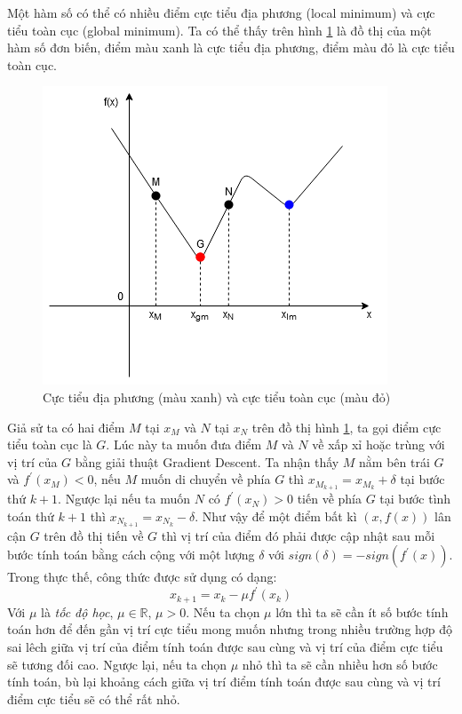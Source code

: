 Một hàm số có thể có nhiều điểm cực tiểu địa phương (local minimum) và cực tiểu toàn cục (global minimum). Ta có thể thấy trên hình \ref{fig:minimums} là đồ thị của một hàm số đơn biến, điểm màu xanh là cực tiểu địa phương, điểm màu đỏ là cực tiểu toàn cục.
\begin{figure}[ht!]
	\centerline{\includegraphics[scale=0.8]{images/minimums.png}}
  	\caption{Cực tiểu địa phương (màu xanh) và cực tiểu toàn cục (màu đỏ)}
  	\label{fig:minimums}
\end{figure}
Giả sử ta có hai điểm $M$ tại $x_M$ và $N$ tại $x_N$ trên đồ thị hình \ref{fig:minimums}, ta gọi điểm cực tiểu toàn cục là $G$. Lúc này ta muốn đưa điểm $M$ và $N$ về xấp xỉ hoặc trùng với vị trí của $G$ bằng giải thuật Gradient Descent. Ta nhận thấy $M$ nằm bên trái $G$ và $f^{'}(x_{M})<0$, nếu $M$ muốn di chuyển về phía $G$ thì $x_{M_{k+1}}=x_{M_{k}}+\delta$ tại bước thứ $k+1$. Ngược lại nếu ta muốn $N$ có $f^{'}(x_{N})>0$ tiến về phía $G$ tại bước tình toán thứ $k+1$ thì $x_{N_{k+1}}=x_{N_{k}}-\delta$. Như vậy để một điểm bất kì $(x,f(x))$ lân cận $G$ trên đồ thị tiến về $G$ thì vị trí của điểm đó phải được cập nhật sau mỗi bước tính toán bằng cách cộng với một lượng $\delta$ với $sign(\delta)=-sign(f^{'}(x))$. Trong thực thế, công thức được sử dụng có dạng:
\begin{equation}
	x_{k+1}=x_{k}-{\mu}f^{'}(x_{k})
\end{equation}
Với $\mu$ là \emph{tốc độ học}, ${\mu}{\in}{\mathbb{R}}$, ${\mu}>0$. Nếu ta chọn $\mu$ lớn thì ta sẽ cần ít số bước tính toán hơn để đến gần vị trí cực tiểu mong muốn nhưng trong nhiều trường hợp độ sai lêch giữa vị trí của điểm tính toán được sau cùng và vị trí của điểm cực tiểu sẽ tương đối cao. Ngược lại, nếu ta chọn $\mu$ nhỏ thì ta sẽ cần nhiều hơn số bước tính toán, bù lại khoảng cách giữa vị trí điểm tính toán được sau cùng và vị trí điểm cực tiểu sẽ có thể rất nhỏ.

